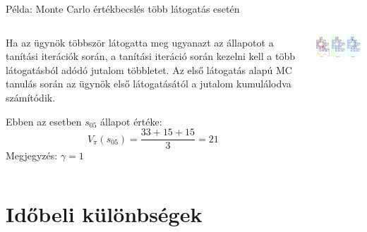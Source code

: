 \documentclass[english, aspectratio=169]{beamer}
\makeatletter
\let\origtableofcontents=\tableofcontents
\def\tableofcontents{\@ifnextchar[{\origtableofcontents}{\gobbletableofcontents}}
\def\gobbletableofcontents#1{\origtableofcontents}
\makeatother
\begin{document}
\begin{frame}{Példa: Monte Carlo értékbecslés több látogatás esetén}
\begin{columns}
\begin{column}{.5\textwidth}
Ha az ügynök többször látogatta meg ugyanazt az állapotot a tanítási iterációk során, a tanítási iteráció során kezelni kell a több látogatásból adódó jutalom többletet. Az első látogatás alapú MC tanulás során az ügynök első látogatásától a jutalom kumulálodva számítódik.\par\smallskip
Ebben az esetben $s_{05}$ állapot értéke:
\[
V_\pi(s_{05})=\frac{33+15+15}{3}=21
\]
Megjegyzés: $\gamma=1$ 
\end{column}
\begin{column}{.5\textwidth}
\begin{center}
\includegraphics[width=7cm, keepaspectratio]{images/mc_td_13.png}
\end{center}
\end{column}
\end{columns}
\end{frame}

\section{Időbeli különbségek}

\begin{frame}
\tableofcontents[currentsection]
\end{frame}
\end{document}
